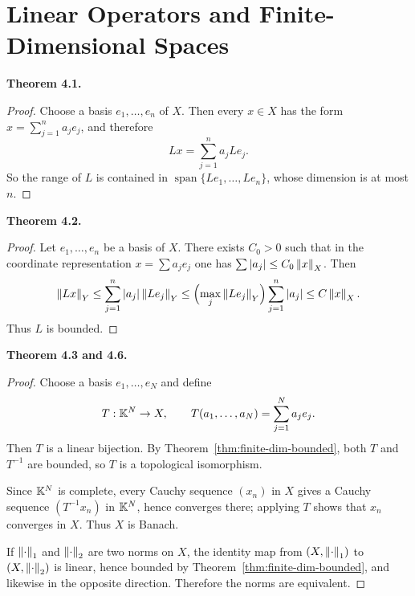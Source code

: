 \documentclass[11pt]{article}
\newenvironment{theoremstmt}[1]{%
  \par\medskip\noindent\textbf{Theorem #1. }\itshape
}{\par\medskip}
\begin{document}
\section{Linear Operators and Finite-Dimensional Spaces}

\begin{theoremstmt}{4.1}
\thmFiniteDimRange
\end{theoremstmt}

\begin{proof}
Choose a basis $e_1,\dots,e_n$ of $X$. Then every $x\in X$ has the form $x=\sum_{j=1}^n a_je_j$, and therefore
\[
Lx=\sum_{j=1}^n a_jLe_j.
\]
So the range of $L$ is contained in $\operatorname{span}\{Le_1,\dots,Le_n\}$, whose dimension is at most $n$.
\end{proof}

\begin{theoremstmt}{4.2}
\thmFiniteDimBounded
\end{theoremstmt}

\begin{proof}
Let $e_1,\dots,e_n$ be a basis of $X$. There exists $C_0>0$ such that in the coordinate representation $x=\sum a_je_j$ one has $\sum \left\lvert a_j\right\rvert\le C_0\left\lVert x\right\rVert_X$. Then
\[
\left\lVert Lx\right\rVert_Y\le \sum_{j=1}^n \left\lvert a_j\right\rvert\left\lVert Le_j\right\rVert_Y
\le \Bigl(\max_j\left\lVert Le_j\right\rVert_Y\Bigr)\sum_{j=1}^n \left\lvert a_j\right\rvert
\le C\left\lVert x\right\rVert_X.
\]
Thus $L$ is bounded.
\end{proof}

\begin{theoremstmt}{4.3 and 4.6}
\thmFiniteDimProperties
\end{theoremstmt}

\begin{proof}
Choose a basis $e_1,\dots,e_N$ and define
\[
T:\mathbb{K}^N\to X,
\qquad
T(a_1,\dots,a_N)=\sum_{j=1}^N a_je_j.
\]
Then $T$ is a linear bijection. By Theorem~\ref{thm:finite-dim-bounded}, both $T$ and $T^{-1}$ are bounded, so $T$ is a topological isomorphism.

Since $\mathbb{K}^N$ is complete, every Cauchy sequence $(x_n)$ in $X$ gives a Cauchy sequence $(T^{-1}x_n)$ in $\mathbb{K}^N$, hence converges there; applying $T$ shows that $x_n$ converges in $X$. Thus $X$ is Banach.

If $\left\lVert \cdot\right\rVert_1$ and $\left\lVert \cdot\right\rVert_2$ are two norms on $X$, the identity map from $(X,\left\lVert \cdot\right\rVert_1)$ to $(X,\left\lVert \cdot\right\rVert_2)$ is linear, hence bounded by Theorem~\ref{thm:finite-dim-bounded}, and likewise in the opposite direction. Therefore the norms are equivalent.
\end{proof}
\end{document}
